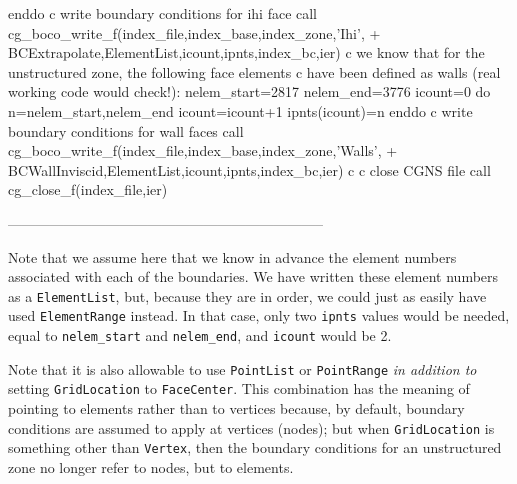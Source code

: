 \documentclass[12pt]{article}
\begin{document}
{\newline\indent      enddo
\newline c  write boundary conditions for ihi face
\newline\indent      call cg\_boco\_write\_f(index\_file,index\_base,index\_zone,'Ihi',
\newline + \indent BCExtrapolate,ElementList,icount,ipnts,index\_bc,ier)
\newline c  we know that for the unstructured zone, the following face elements
\newline c  have been defined as walls (real working code would check!):
\newline\indent      nelem\_start=2817
\newline\indent      nelem\_end=3776
\newline\indent      icount=0
\newline\indent      do n=nelem\_start,nelem\_end
\newline\indent\indent        icount=icount+1
\newline\indent\indent        ipnts(icount)=n
\newline\indent      enddo
\newline c  write boundary conditions for wall faces
\newline\indent      call cg\_boco\_write\_f(index\_file,index\_base,index\_zone,'Walls',
\newline + \indent BCWallInviscid,ElementList,icount,ipnts,index\_bc,ier)
\newline c
\newline c  close CGNS file
\newline\indent      call cg\_close\_f(index\_file,ier)
}

--------------------------------------------------------------------

Note that we assume here that we know in advance the element numbers
associated with each of the boundaries.
We have written these element numbers as a {\tt ElementList}, but, because
they are in order, we could just as easily have used {\tt ElementRange}
instead.
In that case, only two {\tt ipnts} values would be needed, equal to
{\tt nelem\_start} and {\tt nelem\_end}, and {\tt icount} would be 2.

Note that it is also allowable to use {\tt PointList} or {\tt PointRange}
{\it in addition to} setting {\tt GridLocation} to {\tt FaceCenter}.
This combination has the meaning of pointing to elements rather than
to vertices because, by default,
boundary conditions are assumed to apply at vertices (nodes);
but when {\tt GridLocation} is something other than {\tt Vertex},
then the boundary conditions for an unstructured
zone no longer refer to nodes, but to elements.
\end{document}
